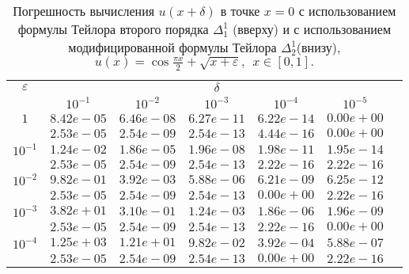 \documentclass[10pt,twoside]{uz_kgu}
\begin{document}
\begin{table} [!htb]
	\caption {Погрешность вычисления $u(x+ \delta)$ в точке $x=0$ с использованием формулы Тейлора второго порядка $\Delta_1^1$ (вверху) и с использованием модифицированной формулы Тейлора $\Delta_2^1$(внизу),
	$u(x)=  \cos \frac{\pi x}{2} + \sqrt{x+\varepsilon} ,\ \    x\in [0,1].$}
	\begin{center}
		\begin{tabular}{|c|c|c|c|c|c|c}
			\cline{1-6} $\varepsilon$ & \multicolumn{5}{c|}{$\delta$} \\
			\cline{2-6} &$10^{-1}$ & $10^{-2}$ & $10^{-3}$  & $10^{-4}$& $10^{-5}$\\
			\cline{1-6}
			$1$
			&$8.42e-05$&$6.46e-08$&$6.27e-11$&$6.22e-14$& $0.00e+00$\\
			&$2.53e-05$&$2.54e-09$&$2.54e-13$&$4.44e-16$& $0.00e+00$\\
			\cline{1-6}
			$10^{-1}$
			&$1.24e-02$&$1.86e-05$&$1.96e-08$&$1.98e-11$&$1.95e-14$\\
			&$2.53e-05$&$2.54e-09$&$2.54e-13$&$2.22e-16$&$2.22e-16$\\
			\cline{1-6}
			$10^{-2}$
			&$9.82e-01$&$3.92e-03$&$5.88e-06$&$6.21e-09$&$6.25e-12$\\
			&$2.53e-05$&$2.54e-09$&$2.54e-13$&$0.00e+00$&$2.22e-16$\\
			\cline{1-6}
			$10^{-3}$
			&$3.82e+01$&$3.10e-01$&$1.24e-03$&$1.86e-06$&$1.96e-09$\\
			&$2.53e-05$&$2.54e-09$&$2.54e-13$&$2.22e-16$&$0.00e+00$\\
			\cline{1-6}
			$10^{-4}$
			&$1.25e+03$&$1.21e+01$&$9.82e-02$&$3.92e-04$&$5.88e-07$\\
			&$2.53e-05$&$2.54e-09$&$2.54e-13$&$0.00e+00$&$2.22e-16$\\
			\cline{1-6}
		\end{tabular}
	\end{center}
\end{table}
\end{document}
